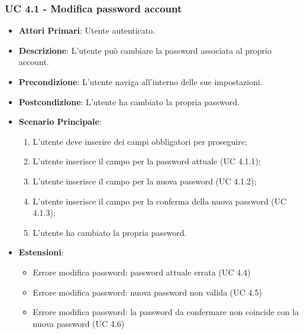 			\subsubsection{UC 4.1 - Modifica password account}
			\begin{itemize}
				\item \textbf{Attori Primari}: Utente autenticato.
				\item \textbf{Descrizione}: L'utente può cambiare la password associata al proprio account.
				\item \textbf{Precondizione}: L'utente naviga all'interno delle sue impostazioni.
				\item \textbf{Postcondizione}: L'utente ha cambiato la propria password.
				\item \textbf{Scenario Principale}:
				\begin{enumerate}
					\item L'utente deve inserire dei campi obbligatori per proseguire;
					\item L'utente inserisce il campo per la password attuale (UC 4.1.1);
					\item L'utente inserisce il campo per la nuova password (UC 4.1.2);
					\item L'utente inserisce il campo per la conferma della nuova password (UC 4.1.3);
					\item L'utente ha cambiato la propria password.
				\end{enumerate}	
				\item \textbf{Estensioni}:
					\begin{itemize}
						\item Errore modifica password: password attuale errata (UC 4.4)
						\item Errore modifica password: nuova password non valida (UC 4.5)
						\item Errore modifica password: la password da confermare non coincide con la nuova password (UC 4.6)
					\end{itemize}
			\end{itemize}

